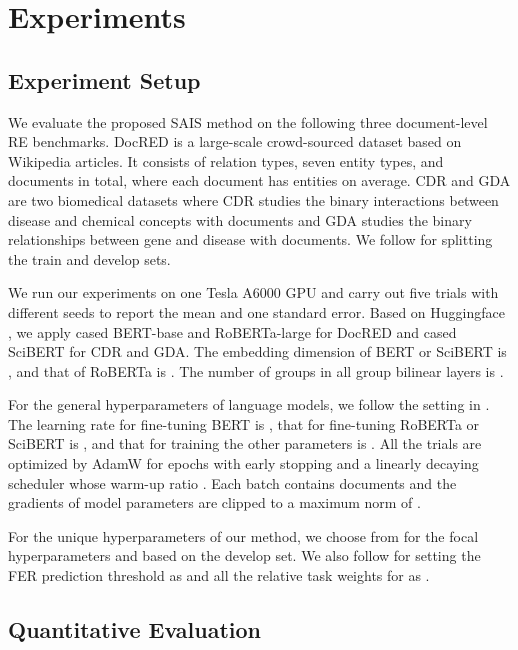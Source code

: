 \section{Experiments} \label{sec:5}

\subsection{Experiment Setup} \label{sec:5.1}

We evaluate the proposed SAIS method on the following three document-level RE benchmarks.
DocRED \cite{yao2019docred} is a large-scale crowd-sourced dataset based on Wikipedia articles.
It consists of  relation types, seven entity types, and  documents in total, where each document has  entities on average. 
CDR \cite{li2016biocreative} and GDA \cite{wu2019renet} are two biomedical datasets where CDR studies the binary interactions between disease and chemical concepts with  documents and GDA studies the binary relationships between gene and disease with  documents.
We follow \citet{christopoulou2019connecting} for splitting the train and develop sets.

We run our experiments on one Tesla A6000 GPU and carry out five trials with different seeds to report the mean and one standard error.
Based on Huggingface \cite{wolf2019huggingface}, we apply cased BERT-base \cite{devlin2018bert} and RoBERTa-large \cite{liu2019roberta} for DocRED and cased SciBERT \cite{beltagy2019scibert} for CDR and GDA.
The embedding dimension  of BERT or SciBERT is , and that of RoBERTa is .
The number of groups  in all group bilinear layers is .

For the general hyperparameters of language models, we follow the setting in \cite{zhou2021document}.
The learning rate for fine-tuning BERT is , that for fine-tuning RoBERTa or SciBERT is , and that for training the other parameters is .
All the trials are optimized by AdamW \cite{loshchilov2017decoupled} for  epochs with early stopping and a linearly decaying scheduler \cite{goyal2017accurate} whose warm-up ratio .
Each batch contains  documents and the gradients of model parameters are clipped to a maximum norm of .


For the unique hyperparameters of our method, we choose  from  for the focal hyperparameters  and  based on the develop set.
We also follow \citet{xie2021eider} for setting the FER prediction threshold  as  and all the relative task weights  for  as .

\subsection{Quantitative Evaluation} \label{sec:5.2}

